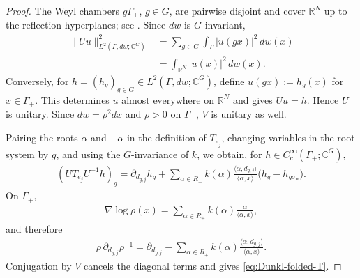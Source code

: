 \documentclass{amsart}
\begin{document}
\begin{proof}
The Weyl chambers \(g\Gamma_+\), \(g\in G\), are pairwise disjoint
and cover \(\mathbb R^N\) up to the reflection hyperplanes; see
\cite[Theorem~2.12]{HeckmanCoxeterGroups}. Since \(dw\) is
\(G\)-invariant,
\begin{align*}
\|Uu\|_{L^2(\Gamma,dw;\mathbb C^G)}^2
&=
\sum_{g\in G}
\int_\Gamma
|u(gx)|^2\,dw(x)\\
&=
\int_{\mathbb R^N}|u(x)|^2\,dw(x).
\end{align*}
Conversely, for
\(h=(h_g)_{g\in G}\in L^2(\Gamma,dw;\mathbb C^G)\), define
\(u(gx):=h_g(x)\) for \(x\in\Gamma_+\). This determines \(u\) almost
everywhere on \(\mathbb R^N\) and gives \(Uu=h\). Hence \(U\) is
unitary. Since \(dw=\rho^2dx\) and \(\rho>0\) on \(\Gamma_+\),
\(V\) is unitary as well.

Pairing the roots \(\alpha\) and \(-\alpha\) in the definition of
\(T_{e_j}\), changing variables in the root system by \(g\), and using
the \(G\)-invariance of \(k\), we obtain, for
\(h\in C_c^\infty(\Gamma_+;\mathbb C^G)\),
\begin{align*}
(UT_{e_j}U^{-1}h)_g
=
\partial_{d_{g,j}}h_g
+
\sum_{\alpha\in R_+}
k(\alpha)
\frac{\langle\alpha,d_{g,j}\rangle}
{\langle\alpha,x\rangle}
\bigl(h_g-h_{g\sigma_\alpha}\bigr).
\end{align*}
On \(\Gamma_+\),
\begin{align*}
\nabla\log\rho(x)
=
\sum_{\alpha\in R_+}
k(\alpha)\frac{\alpha}{\langle\alpha,x\rangle},
\end{align*}
and therefore
\begin{align*}
\rho\,\partial_{d_{g,j}}\rho^{-1}
=
\partial_{d_{g,j}}
-
\sum_{\alpha\in R_+}
k(\alpha)
\frac{\langle\alpha,d_{g,j}\rangle}
{\langle\alpha,x\rangle}.
\end{align*}
Conjugation by \(V\) cancels the diagonal terms and gives
\eqref{eq:Dunkl-folded-T}.


\end{proof}
\end{document}
